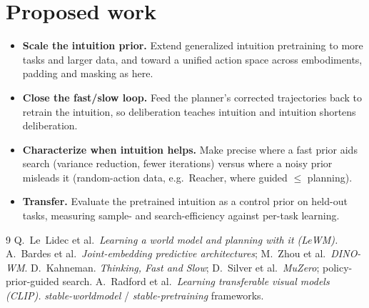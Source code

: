 \documentclass[11pt]{article}
\begin{document}
\section{Proposed work}
\begin{itemize}
\itemsep0.2em
\item \textbf{Scale the intuition prior.} Extend generalized intuition pretraining to more tasks and
larger data, and toward a unified action space across embodiments, padding and masking as here.
\item \textbf{Close the fast/slow loop.} Feed the planner's corrected trajectories back to retrain the
intuition, so deliberation teaches intuition and intuition shortens deliberation.
\item \textbf{Characterize when intuition helps.} Make precise where a fast prior aids search
(variance reduction, fewer iterations) versus where a noisy prior misleads it (random-action data,
e.g.\ Reacher, where guided $\le$ planning).
\item \textbf{Transfer.} Evaluate the pretrained intuition as a control prior on held-out tasks,
measuring sample- and search-efficiency against per-task learning.
\end{itemize}

\begin{thebibliography}{9}
\small
{} Q.\ Le~Lidec et al.\ \emph{Learning a world model and planning with it (LeWM).}
 A.\ Bardes et al.\ \emph{Joint-embedding predictive architectures}; M.\ Zhou et al.\ \emph{DINO-WM}.
 D.\ Kahneman. \emph{Thinking, Fast and Slow}; D.\ Silver et al.\ \emph{MuZero}; policy-prior-guided search.
 A.\ Radford et al.\ \emph{Learning transferable visual models (CLIP).}
 \emph{stable-worldmodel} / \emph{stable-pretraining} frameworks.
\end{thebibliography}
\end{document}
